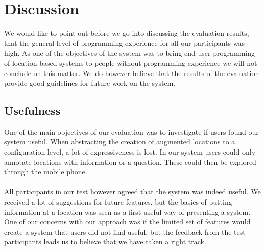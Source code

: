\section{Discussion} %
\label{sec:discusion}
We would like to point out before we go into discussing the evaluation results, that the general level of programming experience for all our participants was high. As one of the objectives of the system was to bring end-user programming of location based systems to people without programming experience we will not conclude on this matter. We do however believe that the results of the evaluation provide good guidelines for future work on the system. 

\subsection{Usefulness} %
\label{sub:usefulness}
One of the main objectives of our evaluation was to investigate if users found our system useful. When abstracting the creation of augmented locations to a configuration level, a lot of expressiveness is lost. In our system users could only annotate locations with information or a question. These could then be explored through the mobile phone.
\\\\
All participants in our test however agreed that the system was indeed useful. We received a lot of suggestions for future features, but the basics of putting information at a location was seen as a first useful way of presenting a system. One of our concerns with our approach was if the limited set of features would create a system that users did not find useful, but the feedback from the test participants leads us to believe that we have taken a right track.

